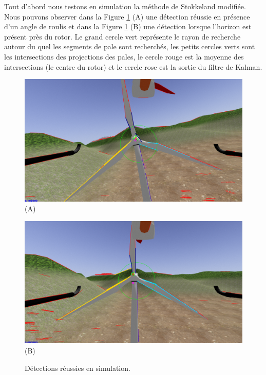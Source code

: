Tout d'abord nous testons en simulation la méthode de Stokkeland modifiée. Nous pouvons observer dans la Figure \ref{fig:sim_detection} (A) une détection réussie en présence d'un angle de roulis et dans la Figure \ref{fig:sim_detection} (B) une détection lorsque l'horizon est présent près du rotor. Le grand cercle vert représente le rayon de recherche autour du quel les segments de pale sont recherchés, les petits cercles verts sont les intersections des projections des pales, le cercle rouge est la moyenne des intersections (le centre du rotor) et le cercle rose est la sortie du filtre de Kalman.
\begin{figure}[htbp]
  \centering
  \begin{minipage}{0.49\textwidth}
    \centering
    \includegraphics[width=\linewidth]{images/sim_detection.png} (A)
  \end{minipage}
  \begin{minipage}{0.49\textwidth}
    \centering
    \includegraphics[width=\linewidth]{images/sim_detection3.png} (B)
  \end{minipage}
  \caption{Détections réussies en simulation.}
  \label{fig:sim_detection}
\end{figure}

